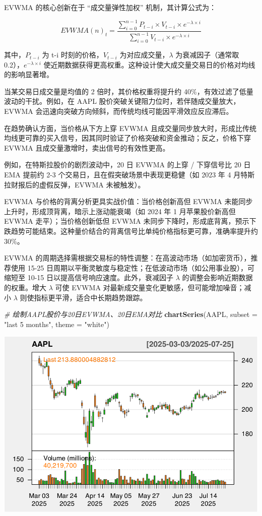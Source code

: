 \documentclass[]{ctexbook}
\newenvironment{Shaded}{\begin{snugshade}}{\end{snugshade}}
\newcommand{\AttributeTok}[1]{\textcolor[rgb]{0.13,0.29,0.53}{#1}}
\newcommand{\CommentTok}[1]{\textcolor[rgb]{0.56,0.35,0.01}{\textit{#1}}}
\newcommand{\FunctionTok}[1]{\textcolor[rgb]{0.13,0.29,0.53}{\textbf{#1}}}
\newcommand{\NormalTok}[1]{#1}
\newcommand{\StringTok}[1]{\textcolor[rgb]{0.31,0.60,0.02}{#1}}
\begin{document}
EVWMA 的核心创新在于 ``成交量弹性加权'' 机制，其计算公式为：

\[
EVWMA(n)_t = \frac{\sum_{i=0}^{n-1} P_{t-i} \times V_{t-i} \times e^{-\lambda \times i}}{\sum_{i=0}^{n-1} V_{t-i} \times e^{-\lambda \times i}}
\]

其中，\(P_{t-i}\) 为 t-i 时刻的价格，\(V_{t-i}\) 为对应成交量，\(\lambda\) 为衰减因子（通常取 0.2），\(e^{-\lambda \times i}\) 使近期数据获得更高权重。这种设计使大成交量交易日的价格对均线的影响显著增。

当某交易日成交量是均值的 2 倍时，其价格权重将提升约 40\%，有效过滤了低量波动的干扰。例如，在 AAPL 股价突破关键阻力位时，若伴随成交量放大，EVWMA 会迅速向突破方向倾斜，而传统均线可能因平滑效应反应滞后。

在趋势确认方面，当价格从下方上穿 EVWMA 且成交量同步放大时，形成比传统均线更可靠的买入信号，因其同时验证了价格突破和资金推动；反之，价格下穿 EVWMA 且成交量激增时，卖出信号的有效性更高。

例如，在特斯拉股价的剧烈波动中，20 日 EVWMA 的上穿 / 下穿信号比 20 日 EMA 提前约 2-3 个交易日，且在假突破场景中表现更稳健（如 2023 年 4 月特斯拉财报后的虚假反弹，EVWMA 未被触发）。

EVWMA 与价格的背离分析更具实战价值：当价格创新高但 EVWMA 未能同步上升时，形成顶背离，暗示上涨动能衰竭（如 2024 年 1 月苹果股价新高但 EVWMA 走平）；当价格创新低但 EVWMA 未同步下降时，形成底背离，预示下跌趋势可能结束。这种量价结合的背离信号比单纯价格指标更可靠，准确率提升约 30\%。

EVWMA 的周期选择需根据交易标的特性调整：在高波动市场（如加密货币），推荐使用 15-25 日周期以平衡灵敏度与稳定性；在低波动市场（如公用事业股），可缩短至 10-15 日以提高信号响应速度。此外，衰减因子 \(\lambda\) 的调整会影响近期数据的权重。增大 \(\lambda\) 可使 EVWMA 对最新成交量变化更敏感，但可能增加噪音；减小 \(\lambda\) 则使指标更平滑，适合中长期趋势跟踪。

\begin{Shaded}
\begin{Highlighting}[]
\CommentTok{\# 绘制AAPL股价与20日EVWMA、20日EMA对比}
\FunctionTok{chartSeries}\NormalTok{(AAPL, }\AttributeTok{subset =} \StringTok{"last 5 months"}\NormalTok{, }\AttributeTok{theme =} \StringTok{"white"}\NormalTok{)}
\end{Highlighting}
\end{Shaded}

\includegraphics[width=0.9\linewidth]{QuantmodHandbook_files/figure-latex/evwma-1}
\end{document}
